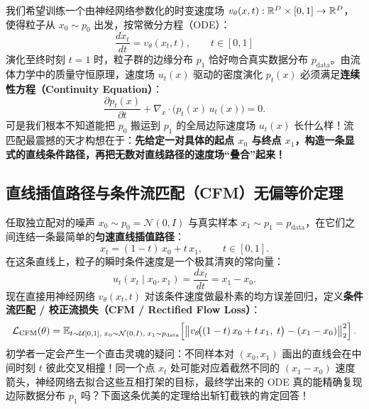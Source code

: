 我们希望训练一个由神经网络参数化的时变速度场 $v_\theta(x, t): \mathbb{R}^D \times [0, 1] \to \mathbb{R}^D$，使得粒子从 $x_0 \sim p_0$ 出发，按常微分方程（ODE）：
\begin{equation}
  \frac{dx_t}{dt} = v_\theta(x_t, t), \qquad t \in [0, 1]
  \label{eq:fm-ode}
\end{equation}
演化至终时刻 $t = 1$ 时，粒子群的边缘分布 $p_1$ 恰好吻合真实数据分布 $p_{\text{data}}$。由流体力学中的质量守恒原理，速度场 $u_t(x)$ 驱动的密度演化 $p_t(x)$ 必须满足\textbf{连续性方程（Continuity Equation）}：
\begin{equation}
  \frac{\partial p_t(x)}{\partial t} + \nabla_x \cdot \!\big(p_t(x)\, u_t(x)\big) = 0.
  \label{eq:continuity}
\end{equation}
可是我们根本不知道能把 $p_0$ 搬运到 $p_1$ 的全局边际速度场 $u_t(x)$ 长什么样！流匹配最震撼的天才构想在于：\textbf{先给定一对具体的起点 $x_0$ 与终点 $x_1$，构造一条显式的直线条件路径，再把无数对直线路径的速度场“叠合”起来！}

\subsection{直线插值路径与条件流匹配（CFM）无偏等价定理}

任取独立配对的噪声 $x_0 \sim p_0 = \mathcal{N}(0, I)$ 与真实样本 $x_1 \sim p_1 = p_{\text{data}}$，在它们之间连结一条最简单的\textbf{匀速直线插值路径}：
\begin{equation}
  x_t = (1 - t)\, x_0 + t\, x_1, \qquad t \in [0, 1].
  \label{eq:rf-path}
\end{equation}
在这条直线上，粒子的瞬时条件速度是一个极其清爽的常向量：
\begin{equation}
  u_t(x_t \mid x_0, x_1) = \frac{dx_t}{dt} = x_1 - x_0.
  \label{eq:rf-cond-vel}
\end{equation}
现在直接用神经网络 $v_\theta(x_t, t)$ 对该条件速度做最朴素的均方误差回归，定义\textbf{条件流匹配 / 校正流损失（CFM / Rectified Flow Loss）}：
\begin{equation}
  \mathcal{L}_{\mathrm{CFM}}(\theta)
  = \mathbb{E}_{t \sim \mathcal{U}[0,1],\; x_0 \sim \mathcal{N}(0, I),\; x_1 \sim p_{\text{data}}}
    \!\left[\left\|v_\theta\!\big((1 - t)\, x_0 + t\, x_1,\; t\big) - (x_1 - x_0)\right\|_2^2\right].
  \label{eq:cfm-loss}
\end{equation}
初学者一定会产生一个直击灵魂的疑问：不同样本对 $(x_0, x_1)$ 画出的直线会在中间时刻 $t$ 彼此交叉相撞！同一个点 $x_t$ 处可能对应着截然不同的 $(x_1 - x_0)$ 速度箭头，神经网络去拟合这些互相打架的目标，最终学出来的 ODE 真的能精确复现边际数据分布 $p_1$ 吗？下面这条优美的定理给出斩钉截铁的肯定回答！

